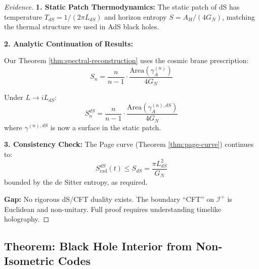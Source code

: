 \documentclass[12pt,a4paper]{article}
\begin{document}
\begin{proof}[Evidence]
\textbf{1. Static Patch Thermodynamics:}
The static patch of dS has temperature $T_{dS} = 1/(2\pi L_{dS})$ and horizon entropy $S = A_H/(4G_N)$, matching the thermal structure we used in AdS black holes.

\textbf{2. Analytic Continuation of Results:}

Our Theorem \ref{thm:spectral-reconstruction} uses the cosmic brane prescription:
\begin{equation}
S_n = \frac{n}{n-1} \cdot \frac{\text{Area}(\gamma_A^{(n)})}{4G_N}
\end{equation}

Under $L \to iL_{dS}$:
\begin{equation}
S_n^{dS} = \frac{n}{n-1} \cdot \frac{\text{Area}(\gamma_A^{(n), dS})}{4G_N}
\end{equation}
where $\gamma^{(n), dS}$ is now a surface in the static patch.

\textbf{3. Consistency Check:}
The Page curve (Theorem \ref{thm:page-curve}) continues to:
\begin{equation}
S_{\text{rad}}^{dS}(t) \leq S_{dS} = \frac{\pi L_{dS}^2}{G_N}
\end{equation}
bounded by the de Sitter entropy, as required.

\textbf{Gap:} No rigorous dS/CFT duality exists. The boundary ``CFT'' on $\mathcal{I}^+$ is Euclidean and non-unitary. Full proof requires understanding timelike holography.
\end{proof}

\subsection{Theorem: Black Hole Interior from Non-Isometric Codes}
\end{document}
